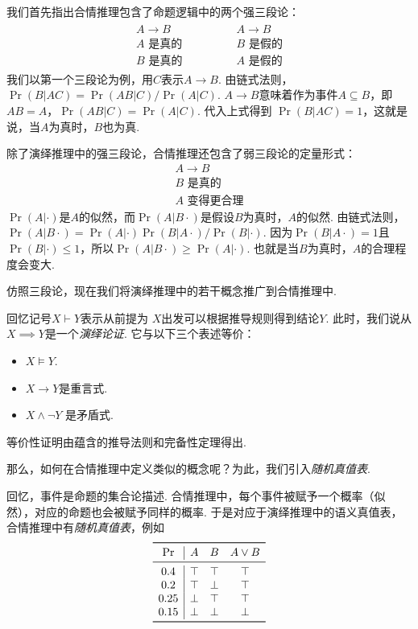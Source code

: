我们首先指出合情推理包含了命题逻辑中的两个强三段论：
        \[
        \begin{array}{c}
            \begin{array}{c}  
                A \to B \\ A\text{ 是真的} \\ \hline B\text{ 是真的}
            \end{array} 
            \qquad \qquad 
            \begin{array}{c}  
                A \to B \\ B\text{ 是假的} \\ \hline A\text{ 是假的}
            \end{array}
        \end{array} 
    \]
我们以第一个三段论为例，用$C$表示$A \to B$. 由链式法则，$\Pr(B|AC) = \Pr(AB|C) / \Pr(A|C)$. $A \to B$意味着作为事件$A\subseteq B$，即$AB=A$，$\Pr(AB|C) = \Pr(A|C)$. 代入上式得到 $\Pr(B|AC) = 1$，这就是说，当$A$为真时，$B$也为真.

除了演绎推理中的强三段论，合情推理还包含了弱三段论的定量形式：
    \[\begin{array}{c}  
            A \to B \\ B\text{ 是真的} \\ \hline A\text{ 变得更合理}
        \end{array}\]
$\Pr(A|\cdot)$是$A$的似然，而$\Pr(A|B\cdot)$是假设$B$为真时，$A$的似然. 由链式法则，$\Pr(A|B\cdot) = \Pr(A|\cdot)\Pr(B|A\cdot)/\Pr(B|\cdot)$. 因为$\Pr(B|A\cdot) = 1$且$\Pr(B|\cdot)\leq 1$，所以$\Pr(A|B\cdot) \geq \Pr(A|\cdot)$. 也就是当$B$为真时，$A$的合理程度会变大.

仿照三段论，现在我们将演绎推理中的若干概念推广到合情推理中. 

回忆记号$X\vdash Y$表示从前提为 $X$出发可以根据推导规则得到结论$Y$. 此时，我们说从$X\implies Y$是一个\textit{演绎论证}. 它与以下三个表述等价：
    \begin{itemize}
        \item $X\vDash Y$.
        \item  $X\to Y$是重言式.
        \item $X\wedge \neg Y$ 是矛盾式.
    \end{itemize}
等价性证明由蕴含的推导法则和完备性定理得出. 

那么，如何在合情推理中定义类似的概念呢？为此，我们引入\textit{随机真值表}. 

回忆，事件是命题的集合论描述. 合情推理中，每个事件被赋予一个概率（似然），对应的命题也会被赋予同样的概率. 于是对应于演绎推理中的语义真值表，合情推理中有\textit{随机真值表}，例如
\[
\begin{array}{c|ccc}
    \toprule
    \Pr & A & B & A\vee B \\ \midrule
    0.4 & \T & \T & \T \\ 
    0.2 & \T & \F & \T \\ 
    0.25 & \F & \T & \T \\
    0.15 & \F & \F & \F \\
    \bottomrule
\end{array}
\]

